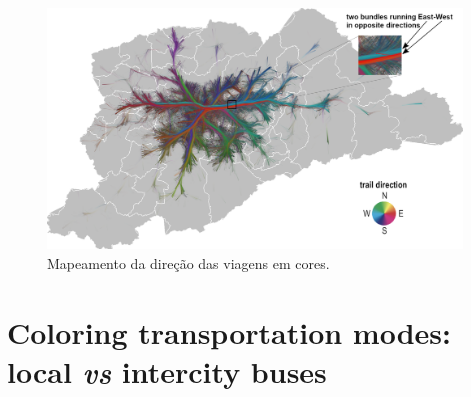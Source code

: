 \begin{figure}[!htb]
  \centering
  \captionsetup{justification=centering}
  \includegraphics[width=0.98\textwidth]{../figuras/directions.png}
  \caption{Mapeamento da direção das viagens em cores. \label{fig:attributes-direction}}
\end{figure}

\section{Coloring transportation modes: local \emph{vs} intercity buses}
\label{sec:coloring}



